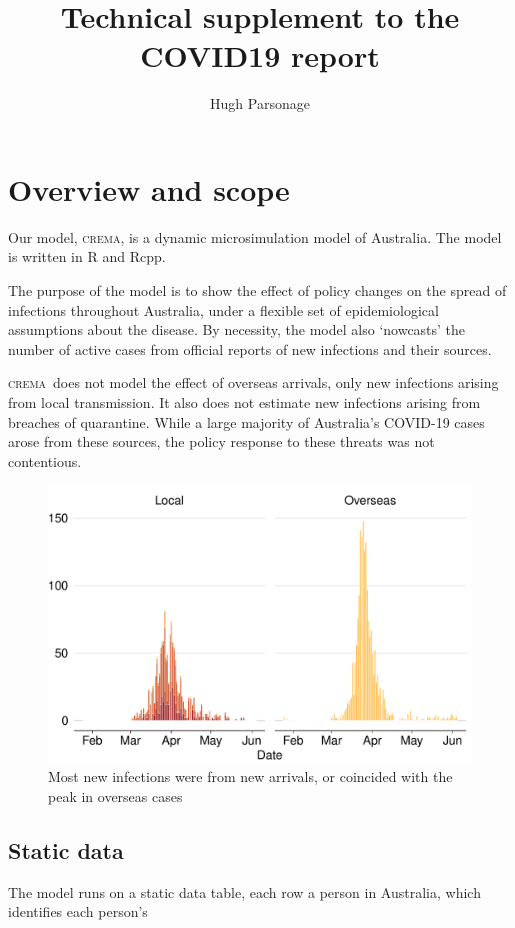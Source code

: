 \documentclass[submission]{grattan}
\title{Technical supplement to the COVID19 report}
\author{Hugh Parsonage}
\providecommand{\crema}{\textsc{crema}}
\begin{document}
\contentspage

\chapter{Overview and scope}\label{chap:tech-supp-overview}
Our model, \crema, is a dynamic microsimulation model of Australia.
The model is written in R and Rcpp.

The purpose of the model is to show the effect of policy changes on the spread of infections 
throughout Australia, under a flexible 
set of epidemiological assumptions about the disease. By necessity, the model also
`nowcasts' the number of active cases from official reports of new infections and
their sources. 

\crema\ does not model the effect of overseas arrivals, only new infections
arising from local transmission. It also does not estimate new infections arising
from breaches of quarantine.  While a large majority of Australia's COVID-19 cases 
arose from these sources, the policy response to these threats was not contentious.

\begin{figure}
\caption{Most new infections were from new arrivals, or coincided with the peak in overseas cases}\label{fig:nsw-sources}
\includegraphics{atlas/nsw-sources.pdf}
\end{figure}

\section{Static data}
The model runs on a static data table, each row a person in Australia,
which identifies each person's
\end{document}
